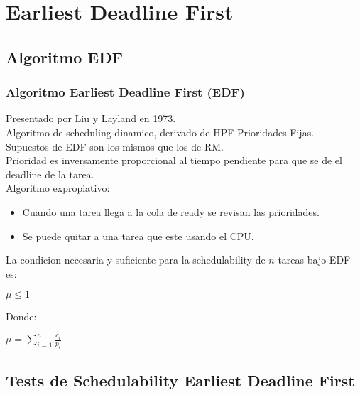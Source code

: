 \documentclass[xcolor=table]{beamer}
\begin{document}

\section{Earliest Deadline First}

\subsection{Algoritmo EDF}

\begin{frame} 
\frametitle{Algoritmo Earliest Deadline First (EDF)} 

Presentado por Liu y Layland en 1973. \\
Algoritmo de scheduling dinamico, derivado de HPF Prioridades Fijas. \\
Supuestos de EDF son los mismos que los de RM. \\
Prioridad es inversamente proporcional al tiempo pendiente para que se de el deadline de la tarea. \\
Algoritmo expropiativo:
\begin{itemize}
\item Cuando una tarea llega a la cola de ready se revisan las prioridades.
\item Se puede quitar a una tarea que este usando el CPU.
\end{itemize} 


La condicion necesaria y suficiente para la schedulability de $n$ tareas bajo EDF es:
\begin{center}
$\mu \leq 1$
\end{center}

Donde:
\begin{center}
$\mu = \sum_{i=1}^{n}\frac{c_i}{p_i}$
\end{center}

\end{frame}

\subsection{Tests de Schedulability  Earliest Deadline First } 
\end{document}
